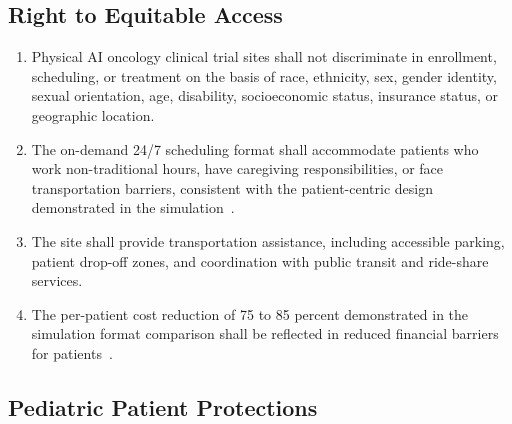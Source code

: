 \subsection{Right to Equitable Access}

\begin{enumerate}[label=(\alph*)]
\item Physical AI oncology clinical trial sites shall not discriminate in
  enrollment, scheduling, or treatment on the basis of race, ethnicity, sex,
  gender identity, sexual orientation, age, disability, socioeconomic status,
  insurance status, or geographic location.

\item The on-demand 24/7 scheduling format shall accommodate patients who work
  non-traditional hours, have caregiving responsibilities, or face
  transportation barriers, consistent with the patient-centric design
  demonstrated in the simulation~\cite{formatcomparison2026}.

\item The site shall provide transportation assistance, including accessible
  parking, patient drop-off zones, and coordination with public transit and
  ride-share services.

\item The per-patient cost reduction of 75 to 85 percent demonstrated in the
  simulation format comparison shall be reflected in reduced financial barriers
  for patients~\cite{formatcomparison2026}.
\end{enumerate}

\subsection{Pediatric Patient Protections}

